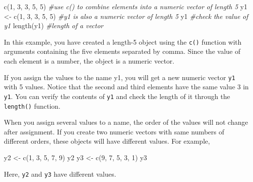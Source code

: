 \documentclass[
]{book}
\newenvironment{Shaded}{\begin{snugshade}}{\end{snugshade}}
\newcommand{\CommentTok}[1]{\textcolor[rgb]{0.56,0.35,0.01}{\textit{#1}}}
\newcommand{\DecValTok}[1]{\textcolor[rgb]{0.00,0.00,0.81}{#1}}
\newcommand{\FunctionTok}[1]{\textcolor[rgb]{0.00,0.00,0.00}{#1}}
\newcommand{\NormalTok}[1]{#1}
\newcommand{\OtherTok}[1]{\textcolor[rgb]{0.56,0.35,0.01}{#1}}
\newenvironment{blackbox}{
  \definecolor{shadecolor}{rgb}{0, 0, 0}  %
  \color{white}
  \begin{shaded}}
 {\end{shaded}}
\newenvironment{infobox}[1]
  {
  \begin{itemize}
  \renewcommand{\labelitemi}{
    \raisebox{-.7\height}[0pt][0pt]{
      {\setkeys{Gin}{width=3em,keepaspectratio}
        \texttt{[image: pics/\#1]}}
    }
  }
  \setlength{\fboxsep}{1em}
  \begin{blackbox}
  \item
  }
  {
  \end{blackbox}
  \end{itemize}
  }
\begin{document}
\begin{Shaded}
\begin{Highlighting}[]
\FunctionTok{c}\NormalTok{(}\DecValTok{1}\NormalTok{, }\DecValTok{3}\NormalTok{, }\DecValTok{3}\NormalTok{, }\DecValTok{5}\NormalTok{, }\DecValTok{5}\NormalTok{)          }\CommentTok{\#use c() to combine elements into a numeric vector of length 5}
\NormalTok{y1 }\OtherTok{\textless{}{-}} \FunctionTok{c}\NormalTok{(}\DecValTok{1}\NormalTok{, }\DecValTok{3}\NormalTok{, }\DecValTok{3}\NormalTok{, }\DecValTok{5}\NormalTok{, }\DecValTok{5}\NormalTok{)    }\CommentTok{\#y1 is also a numeric vector of length 5}
\NormalTok{y1                        }\CommentTok{\#check the value of y1}
\FunctionTok{length}\NormalTok{(y1)                }\CommentTok{\#length of a vector}
\end{Highlighting}
\end{Shaded}

In this example, you have created a length-5 object using the \texttt{c()} function with arguments containing the five elements separated by comma. Since the value of each element is a number, the object is a numeric vector.

If you assign the values to the name y1, you will get a new numeric vector \texttt{y1} with 5 values. Notice that the second and third elements have the same value 3 in \texttt{y1}. You can verify the contents of \texttt{y1} and check the length of it through the \texttt{length()} function.

\begin{infobox}{caution}
When you assign several values to a name, the order of the values will not change after assignment. If you create two numeric vectors with same numbers of different orders, these objects will have different values. For example,

\begin{Shaded}
\begin{Highlighting}[]
\NormalTok{y2 }\OtherTok{\textless{}{-}} \FunctionTok{c}\NormalTok{(}\DecValTok{1}\NormalTok{, }\DecValTok{3}\NormalTok{, }\DecValTok{5}\NormalTok{, }\DecValTok{7}\NormalTok{, }\DecValTok{9}\NormalTok{)    }
\NormalTok{y2                        }
\NormalTok{y3 }\OtherTok{\textless{}{-}} \FunctionTok{c}\NormalTok{(}\DecValTok{9}\NormalTok{, }\DecValTok{7}\NormalTok{, }\DecValTok{5}\NormalTok{, }\DecValTok{3}\NormalTok{, }\DecValTok{1}\NormalTok{)    }
\NormalTok{y3}
\end{Highlighting}
\end{Shaded}

Here, \texttt{y2} and \texttt{y3} have different values.

\end{infobox}
\end{document}
